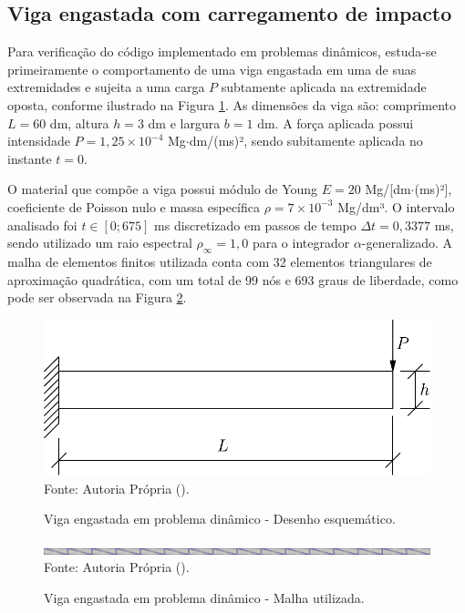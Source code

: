 \subsection{Viga engastada com carregamento de impacto} \label{Ap:DinBeam}

Para verificação do código implementado em problemas dinâmicos, estuda-se  primeiramente o comportamento de uma viga engastada em uma de suas extremidades e sujeita a uma carga $P$ subtamente aplicada na extremidade oposta, conforme ilustrado na Figura \ref{fig:viga1}. As dimensões da viga são: comprimento $L=60$ dm, altura $h=3$ dm e largura $b=1$ dm. A força aplicada possui intensidade $P=1,25\times10^{-4}$ Mg$\cdot$dm/(ms)², sendo subitamente aplicada no instante $t=0$.

O material que compõe a viga possui módulo de Young $E=20$ Mg/[dm$\cdot$(ms)²], coeficiente de Poisson nulo e massa específica $\rho=7\times10^{-3}$ Mg/dm³. O intervalo analisado foi $t\in[0;675]$ ms discretizado em passos de tempo $\Delta t=0,3377$ ms, sendo utilizado um raio espectral $\rho_\infty=1,0$ para o integrador $\alpha$-generalizado. A malha de elementos finitos utilizada conta com 32 elementos triangulares de aproximação quadrática, com um total de 99 nós e 693 graus de liberdade, como pode ser observada na Figura \ref{fig:viga1-mesh}.

\begin{figure}[h!]
    \centering
    \caption{Viga engastada em problema dinâmico - Desenho esquemático.}
    \includegraphics[width=0.5\linewidth]{Figuras/vigas/viga1.pdf}
    \\Fonte: Autoria Própria (\the\year).
    \label{fig:viga1}
\end{figure}

\begin{figure}[h!]
    \centering
    \caption{Viga engastada em problema dinâmico - Malha utilizada.}
    \includegraphics[width=\linewidth]{Figuras/vigas/mesh1.png}
    \\Fonte: Autoria Própria (\the\year).
    \label{fig:viga1-mesh}
\end{figure}


